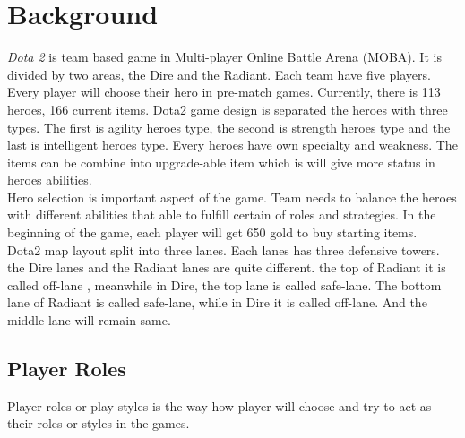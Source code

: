 \section{Background}
\label{sec:background}

\textit{Dota 2} is team based game in Multi-player Online Battle Arena (MOBA). It is divided by two areas, the Dire and the Radiant. Each team have five players. Every player will choose their hero in pre-match games. Currently, there is 113 heroes, 166 current items. Dota2 game design is separated the heroes with three types. The first is agility heroes type, the second is strength heroes type and the last is intelligent heroes type. Every heroes have own specialty and weakness. The items can be combine into upgrade-able item which is will give more status in heroes abilities.
\\
Hero selection is important aspect of the game. Team needs to balance the heroes with different abilities that able to fulfill certain of roles and strategies. In the beginning of the game, each player will get 650 gold to buy starting items. 
\\
Dota2 map layout split into three lanes. Each lanes has three defensive towers. the Dire lanes and the Radiant lanes are quite different. the top of Radiant it is called off-lane , meanwhile in Dire, the top lane is called safe-lane. The bottom lane of Radiant is called safe-lane, while in Dire it is called off-lane. And the middle lane will remain same.
\\

\subsection{Player Roles}
\label{sec:player_roles}

Player roles or play styles is the way how player will choose and try to act as their roles or styles in the games.
